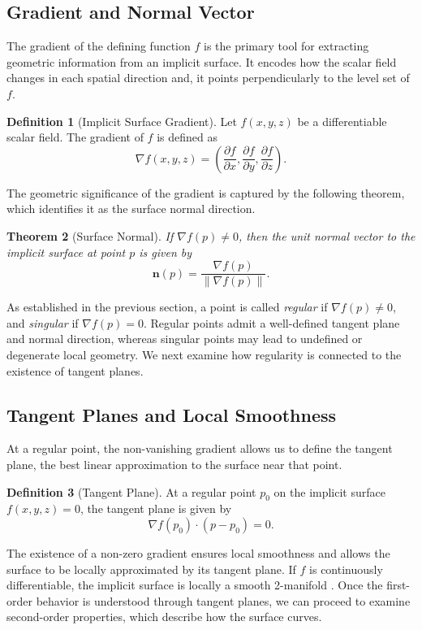 \documentclass[12pt, a4paper, oneside]{book}
\theoremstyle{plain}
\newtheorem{theorem}{Theorem}[chapter]
\theoremstyle{definition}
\newtheorem{definition}[theorem]{Definition}
\theoremstyle{remark}
\theoremstyle{definition}
\begin{document}
\subsection{Gradient and Normal Vector}

The gradient of the defining function $f$ is the primary tool for extracting geometric information from an implicit surface. It encodes how the scalar field changes in each spatial direction and, it points perpendicularly to the level set of $f$.

\begin{definition}[Implicit Surface Gradient]
Let $f(x,y,z)$ be a differentiable scalar field. The gradient of $f$ is defined as
\[
\nabla f(x,y,z) = \left(\frac{\partial f}{\partial x}, \frac{\partial f}{\partial y},
\frac{\partial f}{\partial z}\right).
\]
\end{definition}

The geometric significance of the gradient is captured by the following theorem, which identifies it as the surface normal direction.

\begin{theorem}[Surface Normal]
If $\nabla f(p) \neq 0$, then the unit normal vector to the implicit surface at point $p$
is given by
\[
\mathbf{n}(p) = \frac{\nabla f(p)}{\|\nabla f(p)\|}.
\]
\end{theorem}

As established in the previous section, a point is called \emph{regular} if $\nabla f(p) \neq 0$, and \emph{singular} if $\nabla f(p) = 0$. Regular points admit a well-defined tangent plane and normal direction, whereas singular points may lead to undefined or degenerate local geometry. We next examine how regularity is connected to the existence of tangent planes.

\subsection{Tangent Planes and Local Smoothness}

At a regular point, the non-vanishing gradient allows us to define the tangent plane, the best linear approximation to the surface near that point.

\begin{definition}[Tangent Plane]
At a regular point $p_0$ on the implicit surface $f(x,y,z)=0$, the tangent plane is given by
\[
\nabla f(p_0) \cdot (p - p_0) = 0.
\]
\end{definition}

The existence of a non-zero gradient ensures local smoothness and allows the surface to be locally approximated by its tangent plane. If $f$ is continuously differentiable, the implicit surface is locally a smooth 2-manifold \cite{bloomenthal2000implicit}. Once the first-order behavior is understood through tangent planes, we can proceed to examine second-order properties, which describe how the surface curves.
\end{document}
